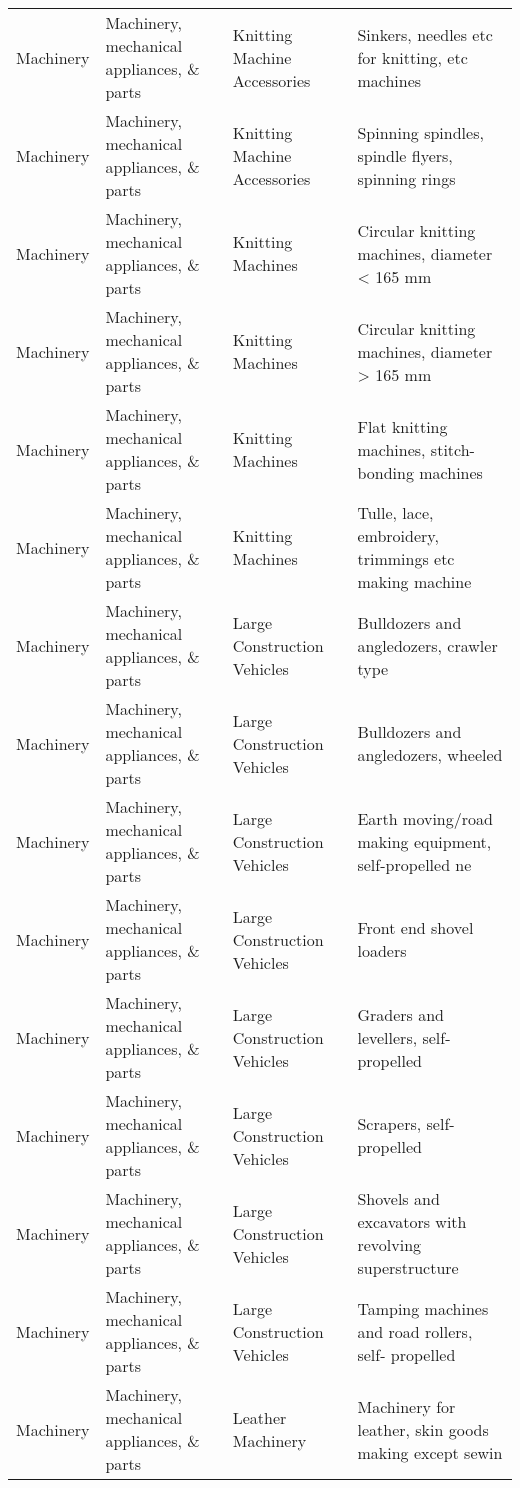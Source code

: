 \begin{appendices}
\begin{xltabular}{\textwidth}{|p{0.07\textwidth}|p{0.25\textwidth}|p{0.28\textwidth}|p{0.3\textwidth}|}
		Machinery & Machinery, mechanical appliances, \& parts & Knitting Machine Accessories & Sinkers, needles etc for knitting, etc machines \\
		Machinery & Machinery, mechanical appliances, \& parts & Knitting Machine Accessories & Spinning spindles, spindle flyers, spinning rings \\
		Machinery & Machinery, mechanical appliances, \& parts & Knitting Machines & Circular knitting machines, diameter < 165 mm \\
		Machinery & Machinery, mechanical appliances, \& parts & Knitting Machines & Circular knitting machines, diameter > 165 mm \\
		Machinery & Machinery, mechanical appliances, \& parts & Knitting Machines & Flat knitting machines, stitch-bonding machines \\
		Machinery & Machinery, mechanical appliances, \& parts & Knitting Machines & Tulle, lace, embroidery, trimmings etc making machine \\
		Machinery & Machinery, mechanical appliances, \& parts & Large Construction Vehicles & Bulldozers and angledozers, crawler type \\
		Machinery & Machinery, mechanical appliances, \& parts & Large Construction Vehicles & Bulldozers and angledozers, wheeled \\
		Machinery & Machinery, mechanical appliances, \& parts & Large Construction Vehicles & Earth moving/road making equipment, self-propelled ne \\
		Machinery & Machinery, mechanical appliances, \& parts & Large Construction Vehicles & Front end shovel loaders \\
		Machinery & Machinery, mechanical appliances, \& parts & Large Construction Vehicles & Graders and levellers, self-propelled \\
		Machinery & Machinery, mechanical appliances, \& parts & Large Construction Vehicles & Scrapers, self-propelled \\
		Machinery & Machinery, mechanical appliances, \& parts & Large Construction Vehicles & Shovels and excavators with revolving superstructure \\
		Machinery & Machinery, mechanical appliances, \& parts & Large Construction Vehicles & Tamping machines and road rollers, self- propelled \\
		Machinery & Machinery, mechanical appliances, \& parts & Leather Machinery & Machinery for leather, skin goods making except sewin \\

\end{xltabular}
\end{appendices}

